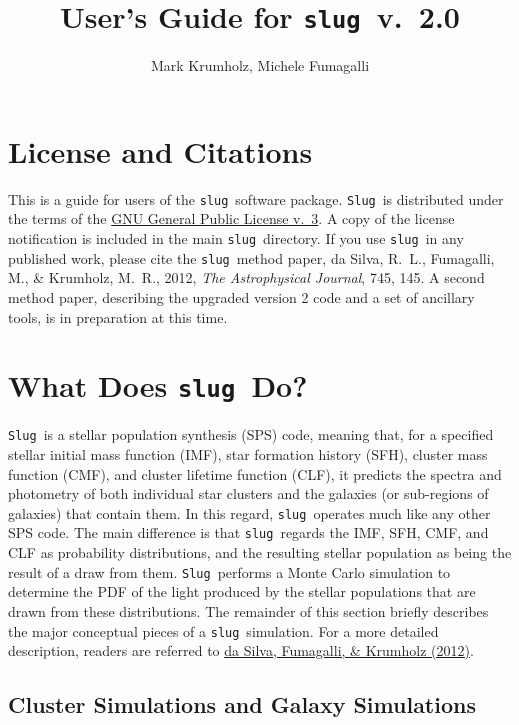 \documentclass[12pt]{article}
\newcommand{\slug}{\texttt{slug}}
\newcommand{\Slug}{\texttt{Slug}}
\begin{document}
\title{User's Guide for \slug\ v.~2.0}
\author{Mark Krumholz, Michele Fumagalli}

\maketitle

\tableofcontents

\clearpage

\section{License and Citations}

This is a guide for users of the \slug\ software package. \Slug\ is distributed under the terms of the \href{http://www.gnu.org/licenses/gpl.html}{GNU General Public License v.~3}. A copy of the license notification is included in the main \slug\ directory. If you use \slug\ in any published work, please cite the \slug\ method paper, da Silva, R.~L., Fumagalli, M., \& Krumholz, M.~R., 2012, \textit{The Astrophysical Journal}, 745, 145. A second method paper, describing the upgraded version 2 code and a set of ancillary tools, is in preparation at this time.

\section{What Does \slug\ Do?}

\Slug\ is a stellar population synthesis (SPS) code, meaning that, for a specified stellar initial mass function (IMF), star formation history (SFH), cluster mass function (CMF), and cluster lifetime function (CLF), it predicts the spectra and photometry of both individual star clusters and the galaxies (or sub-regions of galaxies) that contain them. In this regard, \slug\ operates much like any other SPS code. The main difference is that \slug\ regards the IMF, SFH, CMF, and CLF as probability distributions, and the resulting stellar population as being the result of a draw from them. \Slug\ performs a Monte Carlo simulation to determine the PDF of the light produced by the stellar populations that are drawn from these distributions. The remainder of this section briefly describes the major conceptual pieces of a \slug\ simulation. For a more detailed description, readers are referred to \href{http://adsabs.harvard.edu/abs/2012ApJ...745..145D}{da Silva, Fumagalli, \& Krumholz (2012)}.

\subsection{Cluster Simulations and Galaxy Simulations}
\end{document}
